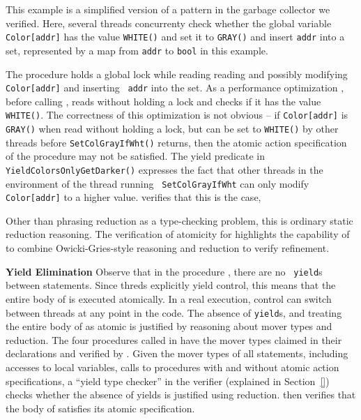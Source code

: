 This example is a simplified version of a pattern in the garbage
collector we verified. Here, several threads concurrenty check 
whether the global variable {\tt Color[addr]} has the value {\tt WHITE()}
and set it to {\tt GRAY()} and insert {\tt addr} into a 
set, represented by a map from {\tt addr} to {\tt bool} in this
example. 

 
The procedure   holds a global lock while reading
reading and possibly modifying {\tt Color[addr]} and inserting {\tt
  addr} into the set. 
As a performance optimization , before calling
, reads  without holding a lock
and checks if it has the value {\tt WHITE()}. The correctness of this
optimization is not obvious -- if {\tt Color[addr]} is {\tt GRAY()} when
read without holding a lock, but can be set to {\tt WHITE()} by other 
threads before {\tt SetColGrayIfWht()} returns, then the atomic action
specification of the procedure may not be satisfied. The yield
predicate in {\tt YieldColorsOnlyGetDarker()} expresses the fact that
other threads in the environment of the thread running {\tt
  SetColGrayIfWht} can only modify {\tt Color[addr]} to a higher
value. \civl verifies that this is the case, 

Other than phrasing reduction as a type-checking problem, this is
ordinary static reduction reasoning. The verification of atomicity for
 highlights the capability of \civl to combine
Owicki-Gries-style reasoning and reduction to verify refinement.

{\bf Yield Elimination} Observe that in the procedure , there are no {\tt
  yield}s between statements. Since threds explicitly yield
control, this means that the entire body of 
is executed atomically. In a real execution, control can switch
between threads at any point in the code. The absence of {\tt yield}s,
and treating the entire body of  as atomic 
is justified by reasoning about mover types and reduction. The
four procedures called in  have the mover
types claimed in their declarations and verified by \civl. Given
the mover types of all statements, including accesses to local
variables, calls to procedures with and without atomic action
specifications, a ``yield type checker'' in the \civl verifier 
(explained in Section~\ref{}) checks whether the absence of yields is
justified using reduction.  \civl then verifies that the body of
 satisfies its atomic specification. 


